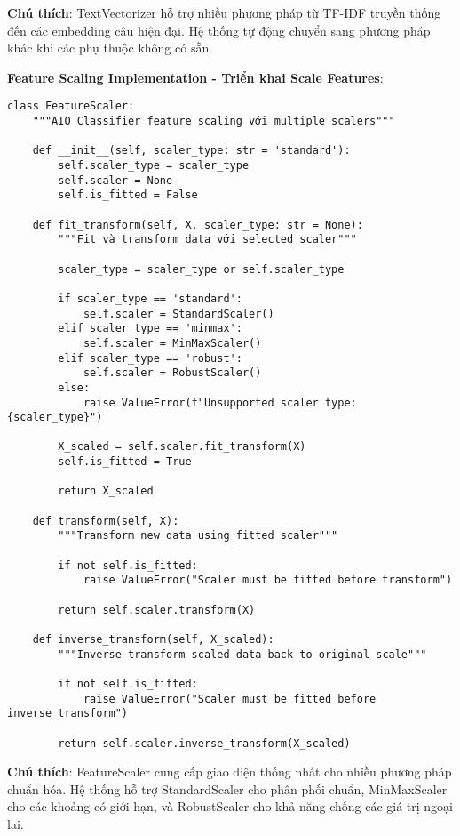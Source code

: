 \textbf{Chú thích}: TextVectorizer hỗ trợ nhiều phương pháp từ TF-IDF truyền thống đến các embedding câu hiện đại. Hệ thống tự động chuyển sang phương pháp khác khi các phụ thuộc không có sẵn.

\textbf{Feature Scaling Implementation - Triển khai Scale Features}:

\begin{verbatim}
class FeatureScaler:
    """AIO Classifier feature scaling với multiple scalers"""
    
    def __init__(self, scaler_type: str = 'standard'):
        self.scaler_type = scaler_type
        self.scaler = None
        self.is_fitted = False
        
    def fit_transform(self, X, scaler_type: str = None):
        """Fit và transform data với selected scaler"""
        
        scaler_type = scaler_type or self.scaler_type
        
        if scaler_type == 'standard':
            self.scaler = StandardScaler()
        elif scaler_type == 'minmax':
            self.scaler = MinMaxScaler()
        elif scaler_type == 'robust':
            self.scaler = RobustScaler()
        else:
            raise ValueError(f"Unsupported scaler type: {scaler_type}")
            
        X_scaled = self.scaler.fit_transform(X)
        self.is_fitted = True
        
        return X_scaled
        
    def transform(self, X):
        """Transform new data using fitted scaler"""
        
        if not self.is_fitted:
            raise ValueError("Scaler must be fitted before transform")
            
        return self.scaler.transform(X)
        
    def inverse_transform(self, X_scaled):
        """Inverse transform scaled data back to original scale"""
        
        if not self.is_fitted:
            raise ValueError("Scaler must be fitted before inverse_transform")
            
        return self.scaler.inverse_transform(X_scaled)
\end{verbatim}

\textbf{Chú thích}: FeatureScaler cung cấp giao diện thống nhất cho nhiều phương pháp chuẩn hóa. Hệ thống hỗ trợ StandardScaler cho phân phối chuẩn, MinMaxScaler cho các khoảng có giới hạn, và RobustScaler cho khả năng chống các giá trị ngoại lai.

